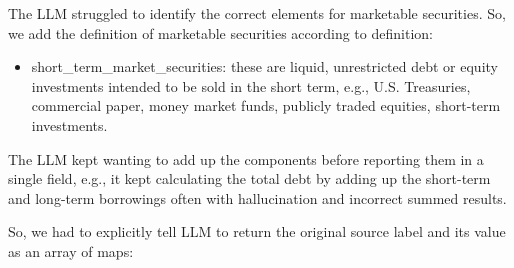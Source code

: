 \documentclass[12pt,a4paper]{article}
\begin{document}
The LLM struggled to identify the correct elements for marketable
securities. So, we add the definition of marketable securities according
to definition:

\begin{itemize}
\item
  short\_term\_market\_securities: these are liquid, unrestricted debt
  or equity investments intended to be sold in the short term, e.g.,
  U.S. Treasuries, commercial paper, money market funds, publicly traded
  equities, short-term investments.
\end{itemize}

The LLM kept wanting to add up the components before reporting them in a
single field, e.g., it kept calculating the total debt by adding up the
short-term and long-term borrowings often with hallucination and
incorrect summed results.

So, we had to explicitly tell LLM to return the original source label
and its value as an array of maps:
\end{document}
